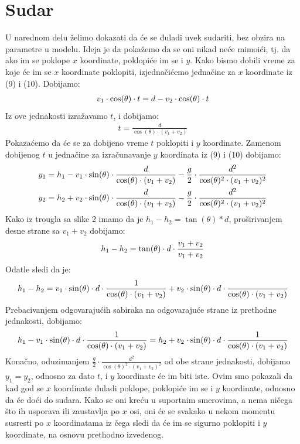 \documentclass{article}
\begin{document}
\section{\huge Sudar}\label{sec:sudar}
U narednom delu želimo dokazati da će se đuladi uvek sudariti, bez obzira na parametre u modelu. Ideja je da pokažemo da se oni nikad neće mimoići, tj. da ako im se poklope $x$ koordinate, poklopiće im se i $y$.
\newline
\newline Kako bismo dobili vreme za koje će im se $x$ koordinate poklopiti, izjednačićemo jednačine za $x$ koordinate iz (9) i (10). Dobijamo: 
\begin{align}
    v_1 \cdot \cos(\theta) \cdot t = d - v_2 \cdot \cos(\theta) \cdot t \notag
\end{align}
Iz ove jednakosti izražavamo $t$, i dobijamo:
\begin{align}
    t = \frac{d}{\cos(\theta) \cdot (v_1 + v_2)}        \tag{11}
\end{align}
Pokazaćemo da će se za dobijeno vreme $t$ poklopiti i $y$ koordinate.
Zamenom dobijenog $t$ u jednačine za izračunavanje $y$ koordinata iz (9) i (10) dobijamo:
\begin{align}
    y_1 = h_1 - v_1 \cdot \sin(\theta) \cdot \frac{d}{\cos(\theta) \cdot (v_1 + v_2)} - \frac{g}{2} \cdot \frac{d^2}{\cos(\theta)^2 \cdot (v_1 + v_2)^2} \nonumber \\ 
    y_2 = h_2 + v_2 \cdot \sin(\theta) \cdot \frac{d}{\cos(\theta) \cdot (v_1 + v_2)} - \frac{g}{2} \cdot \frac{d^2}{\cos(\theta)^2 \cdot (v_1 + v_2)^2} \notag
\end{align}
Kako iz trougla sa slike 2 imamo da je $h_1 - h_2 = \tan(\theta) * d$, proširivanjem desne strane sa $v_1 + v_2$ dobijamo:
\begin{align}
    h_1 - h_2 = \tan(\theta) \cdot d \cdot \frac{v_1 + v_2}{v_1 + v_2} \notag
\end{align}
Odatle sledi da je:
\begin{align}
    h_1 - h_2 = v_1 \cdot \sin(\theta) \cdot d \cdot  \frac{1}{\cos(\theta) \cdot (v_1 + v_2)} + v_2 \cdot \sin(\theta) \cdot d \cdot \frac{}{\cos(\theta) \cdot (v_1 + v_2)} \notag
\end{align}
Prebacivanjem odgovarajućih sabiraka na odgovarajuće strane iz prethodne jednakosti, dobijamo:
\begin{align}
    h_1 -v_1 \cdot \sin(\theta) \cdot d \cdot  \frac{1}{\cos(\theta) \cdot (v_1 + v_2)} = h_2 + v_2 \cdot \sin(\theta) \cdot d \cdot \frac{1}{\cos(\theta) \cdot (v_1 + v_2)} \notag
\end{align}
Konačno, oduzimanjem $\frac{g}{2} \cdot \frac{d^2}{\cos(\theta)^2 \cdot (v_1 + v_2)^2}$ od obe strane jednakosti, dobijamo $y_1 = y_2$, odnosno za dato $t$, i $y$ koordinate će im biti iste.
\newline
\newline
Ovim smo pokazali da kad god se $x$ koordinate đuladi poklope, poklopiće im se i $y$ koordinate, odnosno da će doći do sudara. Kako se oni kreću u suportnim smerovima, a nema ničega što ih usporava ili zaustavlja po $x$ osi, oni će se svakako u nekom momentu susresti po $x$ koordinatama iz čega sledi da će im se sigurno poklopiti i $y$ koordinate, na osnovu prethodno izvedenog.
\newpage
\end{document}
